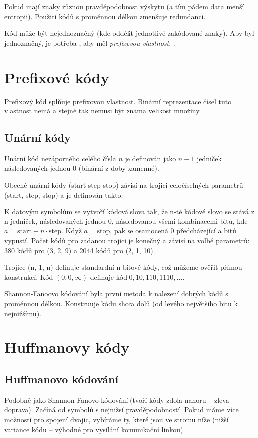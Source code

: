 \documentclass[a4paper, 11pt]{report}
\begin{document}
Pokud mají znaky různou pravděpodobnost výskytu (a tím pádem data menší entropii). Použití kódů s proměnnou délkou zmenšuje redundanci.

Kód může být nejednoznačný (kde oddělit jednotlivé zakódované znaky). Aby byl jednoznačný, je potřeba , aby měl \emph{prefixovou vlastnost}:
.

\section{Prefixové kódy}
Prefixový kód splňuje prefixovou vlastnost. Binární reprezentace čísel tuto vlastnost nemá a stejně tak nemusí být známa velikost množiny.

\subsection{Unární kódy}
Unární kód nezáporného celého čísla $n$ je definován jako $n-1$ jedniček následovaných jednou 0 (binární z doby kamenné).

Obecné unární kódy (start-step-stop) závisí na trojici celočíselných parametrů (start, step, stop) a je definován takto:

K datovým symbolům se vytvoří kódová slova tak, že n-té kódové slovo se stává z n jedniček, následovaných jednou 0, následovanou všemi kombinacemi bitů, kde $a = \text{start} + n \cdot \text{step}$. Když $a = \text{stop}$, pak se osamocená 0 předcházející a bitů vypustí. Počet kódů pro zadanou trojici je konečný a závisí na volbě parametrů: 380 kódů pro (3, 2, 9) a 2044 kódů pro (2, 1, 10).

Trojice (n, 1, n) definuje standardní n-bitové kódy, což můžeme ověřit přímou konstrukcí. Kód $(0, 0, \infty)$ definuje kód $0, 10, 110, 1110, \dots$.

Shannon-Fanoovo kódování byla první metoda k nalezení dobrých kódů s proměnnou délkou. Konstruuje kódu shora dolů (od levého největšího bitu k nejnižšímu).

\section{Huffmanovy kódy}

\subsection{Huffmanovo kódování}
Podobně jako Shannon-Fanovo kódování (tvoří kódy zdola nahoru -- zleva doprava). Začíná od symbolů s nejnižsí pravděpodobností.
Pokud máme více možností pro spojení dvojic, vybíráme ty, které jsou ve stromu níže (nižší variance kódu -- výhodné pro vysílání komunikační linkou).
\end{document}
